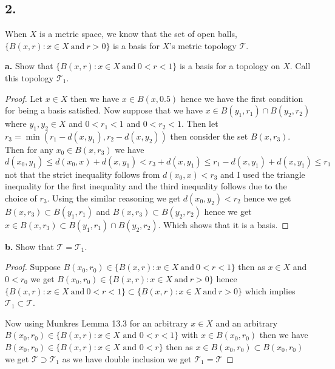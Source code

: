 \documentclass{amsart}
\theoremstyle{plain}
\theoremstyle{definition}
\theoremstyle{remark}
\begin{document}
\vspace{.15in}

\noindent
\subsection*{2.}  When $X$ is a metric space, we know that the set of open balls, $\{ B(x,r) : x\in X \ \mbox{and} \ r>0\}$ is a basis for $X$'s metric topology $\mathcal T$. 


\vspace{.1in}
{\bfseries a.} Show that $\{ B(x,r) : x\in X \ \mbox{and} \ 0<r<1\}$ is a basis for a topology on $X$. Call this topology $\mathcal T _1$. 

\begin{proof}
    Let $x\in X$ then we have $x\in B(x,0.5)$ hence we have the first condition for being a basis satisfied.  Now suppose that we have $x\in B(y_1,r_1)\cap B(y_2,r_2)$ where $y_1,y_2\in X$ and $0<r_1<1$ and $0<r_2<1$. Then let $r_3=\min(r_1-d(x,y_1),r_2-d(x,y_2))$ then consider the set $B(x,r_3)$. Then for any $x_0\in B(x,r_3)$ we have $d(x_0,y_1)\leq d(x_0,x)+d(x,y_1)< r_3+d(x,y_1)\leq r_1-d(x,y_1)+d(x,y_1)\leq r_1$ not that the strict inequality follows from $d(x_0,x)<r_3$ and I used the triangle inequality for the first inequality and the third inequality follows due to the choice of $r_3$. Using the similar reasoning we get $d(x_0,y_2)<r_2$ hence we get $B(x,r_3)\subset B(y_1,r_1)$ and $B(x,r_3)\subset B(y_2,r_2)$ hence we get $x\in B(x,r_3)\subset B(y_1,r_1)\cap B(y_2,r_2)$. Which shows that it is a basis. 
\end{proof}


\vspace{.1in}
{\bfseries b.} Show that $\mathcal T = \mathcal T _1$. 
\begin{proof}
    Suppose $B(x_0,r_0)\in \{ B(x,r) : x\in X \ \mbox{and} \ 0<r<1\}$ then as $x\in X$ and $0<r_0$ we get $B(x_0,r_0)\in \{ B(x,r) : x\in X \ \mbox{and} \ r>0\}$ hence $\{ B(x,r) : x\in X \ \mbox{and} \ 0<r<1\}\subset \{ B(x,r) : x\in X \ \mbox{and} \ r>0\}$ which implies $\mathcal T_1\subset \mathcal T$. 

    Now using Munkres Lemma 13.3 for an arbitrary $x\in X$ and an arbitrary $B(x_0,r_0)\in \{B(x,r): x\in X \text{ and } 0<r<1\}$ with $x\in B(x_0,r_0)$ then we have $B(x_0,r_0)\in \{B(x,r): x \in X \text{ and } 0<r\}$ then as $x\in B(x_0,r_0)\subset B(x_0,r_0)$ we get $\mathcal T\supset \mathcal T_1$ as we have double inclusion we get $\mathcal T_1 =\mathcal T$ 
\end{proof}
\end{document}
